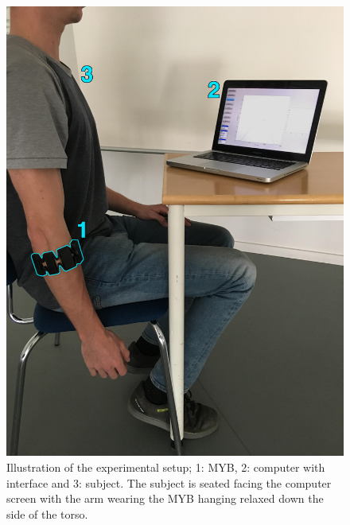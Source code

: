 \begin{figure}[H]                 
	\includegraphics[width=.8\textwidth]{figures/pMethods/experimentSetup}  
	\caption{Illustration of the experimental setup; 1: MYB, 2: computer with interface and 3: subject. The subject is seated facing the computer screen with the arm wearing the MYB hanging relaxed down the side of the torso.}
	\label{fig:experiment_setup} 
\end{figure}

